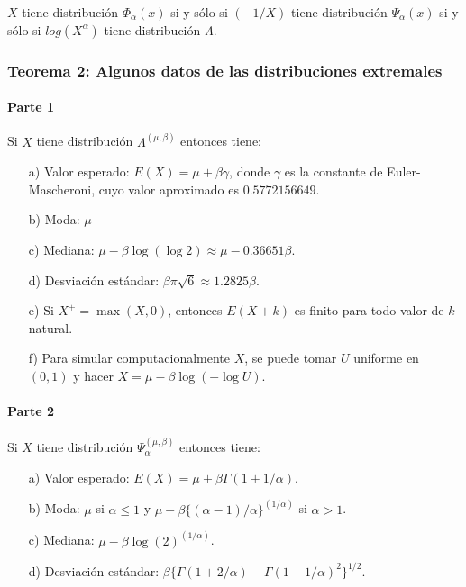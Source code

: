 \documentclass[
  12pt]{article}
\begin{document}
\(X\) tiene distribución \(\Phi_{\alpha}(x)\) si y sólo si \((-1/X)\)
tiene distribución \(\Psi_{\alpha}(x)\) si y sólo si \(log(X^{\alpha})\)
tiene distribución \(\Lambda\).

\hypertarget{teorema-2-algunos-datos-de-las-distribuciones-extremales}{%
\subsubsection{Teorema 2: Algunos datos de las distribuciones
extremales}\label{teorema-2-algunos-datos-de-las-distribuciones-extremales}}

\hypertarget{parte-1}{%
\paragraph{Parte 1}\label{parte-1}}

Si \(X\) tiene distribución \(\Lambda^{(\mu,\beta)}\) entonces tiene:

\begin{itemize}
  \item[a)] Valor esperado: $E(X) = \mu + \beta\gamma$, donde $\gamma$ es la constante de Euler-Mascheroni, cuyo valor aproximado es $0.5772156649$.
  \item[b)] Moda: $\mu$
  \item[c)] Mediana: $\mu - \beta \log(\log 2) \approx \mu - 0.36651 \beta$.
  \item[d)] Desviación estándar: $\beta \pi \sqrt{6} \approx 1.2825 \beta$.
  \item[e)] Si $X^+ = \max(X,0)$, entonces $E(X+k)$ es finito para todo valor de $k$ natural.
  \item[f)] Para simular computacionalmente $X$, se puede tomar $U$ uniforme en $(0,1)$ y hacer $X = \mu - \beta \log(-\log U)$.
\end{itemize}

\hypertarget{parte-2}{%
\paragraph{Parte 2}\label{parte-2}}

Si \(X\) tiene distribución \(\Psi_{\alpha}^{(\mu,\beta)}\) entonces
tiene:

\begin{itemize}
  \item[a)] Valor esperado: $E(X) = \mu + \beta\Gamma(1+1/\alpha)$.
  \item[b)] Moda: $\mu$ si $\alpha\leq 1$ y $\mu-\beta\{(\alpha-1)/\alpha\}^{(1/\alpha)}$ si $\alpha>1$.
  \item[c)] Mediana: $\mu - \beta \log(2)^{(1/\alpha)}$.
  \item[d)] Desviación estándar: $\beta\{\Gamma(1+2/\alpha)-\Gamma(1+1/\alpha)^2\}^{1/2}$.
\end{itemize}
\end{document}
